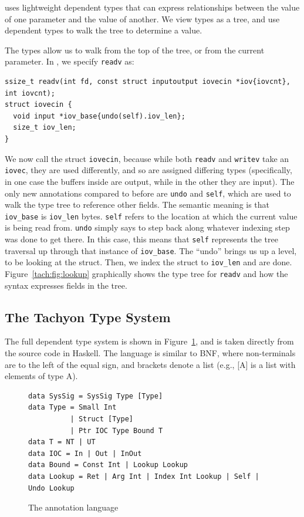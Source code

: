 \tachyon uses lightweight dependent types that can express
relationships between the value of one parameter and the value of
another.  We view types as a tree, and use dependent types to walk the
tree to determine a value.  


The types allow us to walk from the top of the tree, or from the
current parameter.  In \tachyon, we specify {\tt readv} as:
\begin{lstlisting}
ssize_t readv(int fd, const struct inputoutput iovecin *iov{iovcnt}, int iovcnt);
struct iovecin {
  void input *iov_base{undo(self).iov_len};
  size_t iov_len;
}
\end{lstlisting}
We now call the struct \texttt{iovecin}, because while both
\texttt{readv} and \texttt{writev} take an \texttt{iovec}, they are
used differently, and so are assigned differing types (specifically,
in one case the buffers inside are output, while in the other they
are input).  The only new annotations compared to before are
\texttt{undo} and \texttt{self}, which are used to walk the type
tree to reference other fields. The semantic meaning is that
\texttt{iov\_base} is \texttt{iov\_len} bytes.  \texttt{self} refers
to the location at which the current value is being read from.
\texttt{undo} simply says to step back along whatever indexing step
was done to get there.  In this case, this means that \texttt{self}
represents the tree traversal up through that instance of
\texttt{iov\_base}. The ``undo'' brings us up a level, to be looking
at the struct. Then, we index the struct to \texttt{iov\_len} and are
done.  Figure~\ref{tach:fig:lookup} graphically shows the type tree for
\texttt{readv} and how the syntax expresses fields in the tree.



\subsection{The Tachyon Type System}
The full \tachyon dependent type system is shown in
Figure~\ref{tach:fig:annotations}, and is taken directly from the \tachyon
source code in Haskell.  The language is similar to BNF, where
non-terminals are to the left of the equal sign, and brackets denote
a list (e.g., [A] is a list with elements of type A).


\begin{figure}
\lstset{language=Haskell}
\begin{lstlisting}
data SysSig = SysSig Type [Type]
data Type = Small Int
          | Struct [Type]
          | Ptr IOC Type Bound T
data T = NT | UT
data IOC = In | Out | InOut
data Bound = Const Int | Lookup Lookup
data Lookup = Ret | Arg Int | Index Int Lookup | Self | Undo Lookup
\end{lstlisting}
\caption{The \tachyon annotation language}
\label{tach:fig:annotations}
\end{figure}

